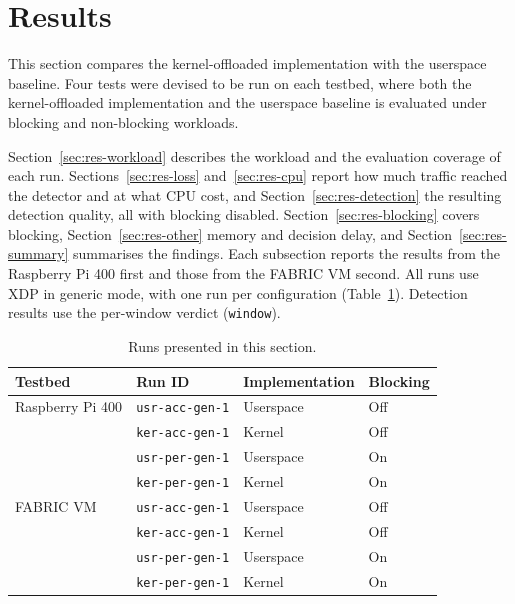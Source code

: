 
\providecommand{\fillin}[1]{\textbf{[#1]}}
\providecommand{\figplaceholder}[1]{%
  \fbox{\parbox[c][4.5cm][c]{0.92\linewidth}{\centering\small #1}}}

\section{Results}
\label{sec:results}

This section compares the kernel-offloaded implementation with the userspace
baseline. Four tests were devised to be run on each testbed, where both the kernel-offloaded implementation and the userspace baseline is evaluated under blocking and non-blocking workloads.


Section~\ref{sec:res-workload} describes the workload and the
evaluation coverage of each run. Sections~\ref{sec:res-loss}
and~\ref{sec:res-cpu} report how much traffic reached the detector and at
what CPU cost, and Section~\ref{sec:res-detection} the resulting detection
quality, all with blocking disabled. Section~\ref{sec:res-blocking} covers
blocking, Section~\ref{sec:res-other} memory and decision delay, and
Section~\ref{sec:res-summary} summarises the findings. Each subsection
reports the results from the Raspberry Pi 400 first and those from the
FABRIC VM second. All runs use XDP in generic mode, with one run per
configuration (Table~\ref{tab:runs}). Detection results use the per-window
verdict (\texttt{window}).

\begin{table}[H]
  \centering
  \small
  \begin{tabular}{llll}
    \toprule
    Testbed & Run ID & Implementation & Blocking \\
    \midrule
    Raspberry Pi 400 & \texttt{usr-acc-gen-1} & Userspace & Off \\
                     & \texttt{ker-acc-gen-1} & Kernel    & Off \\
                     & \texttt{usr-per-gen-1} & Userspace & On  \\
                     & \texttt{ker-per-gen-1} & Kernel    & On  \\
    \midrule
    FABRIC VM        & \texttt{usr-acc-gen-1} & Userspace & Off \\
                     & \texttt{ker-acc-gen-1} & Kernel & Off \\
                     & \texttt{usr-per-gen-1} & Userspace & On \\
                     & \texttt{ker-per-gen-1} & Kernel & On \\
    \bottomrule
  \end{tabular}
  \caption{Runs presented in this section.}
  \label{tab:runs}
\end{table}

